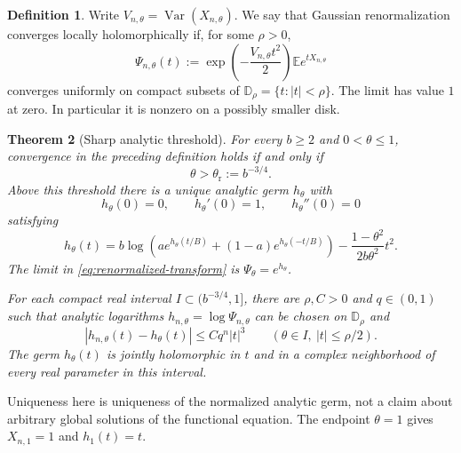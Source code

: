 \documentclass[11pt]{article}
\newtheorem{theorem}{Theorem}[section]
\theoremstyle{definition}
\newtheorem{definition}[theorem]{Definition}
\newcommand{\E}{\mathbb E}
\newcommand{\Var}{\operatorname{Var}}
\newcommand{\res}{\theta_{\mathrm r}}
\newcommand{\Disk}{\mathbb D}
\begin{document}
\begin{definition}
Write $V_{n,\theta}=\Var(X_{n,\theta})$. We say that Gaussian
renormalization converges locally holomorphically if, for some $\rho>0$,
\begin{equation}\label{eq:renormalized-transform}
 \Psi_{n,\theta}(t)
   :=\exp\!\left(-\frac{V_{n,\theta}t^2}{2}\right)
      \E e^{tX_{n,\theta}}
\end{equation}
converges uniformly on compact subsets of $\Disk_\rho=\{t:|t|<\rho\}$.
The limit has value $1$ at zero. In particular it is nonzero on a
possibly smaller disk.
\end{definition}

\begin{theorem}[Sharp analytic threshold]\label{thm:sharp}
For every $b\geq2$ and $0<\theta\leq1$, convergence in the preceding
definition holds if and only if
\begin{equation}\label{eq:threshold}
                         \theta>\res:=b^{-3/4}.
\end{equation}
Above this threshold there is a unique analytic germ $h_\theta$ with
\[
 h_\theta(0)=0,\qquad h_\theta'(0)=1,
 \qquad h_\theta''(0)=0
\]
satisfying
\begin{equation}\label{eq:fixed-h}
 h_\theta(t)=b\log\!\left(
        a e^{h_\theta(t/B)}+(1-a)e^{h_\theta(-t/B)}\right)
                -\frac{1-\theta^2}{2b\theta^2}t^2.
\end{equation}
The limit in \eqref{eq:renormalized-transform} is
$\Psi_\theta=e^{h_\theta}$.

For each compact real interval $I\subset(b^{-3/4},1]$, there are
$\rho,C>0$ and $q\in(0,1)$ such that analytic logarithms
$h_{n,\theta}=\log\Psi_{n,\theta}$ can be chosen on $\Disk_\rho$ and
\begin{equation}\label{eq:uniform-exponential}
 |h_{n,\theta}(t)-h_\theta(t)|\leq Cq^n|t|^3
 \qquad(\theta\in I,\ |t|\leq\rho/2).
\end{equation}
The germ $h_\theta(t)$ is jointly holomorphic in $t$ and in a complex
neighborhood of every real parameter in this interval.
\end{theorem}

Uniqueness here is uniqueness of the normalized analytic germ, not a
claim about arbitrary global solutions of the functional equation.
The endpoint $\theta=1$ gives $X_{n,1}=1$ and $h_1(t)=t$.
\end{document}
